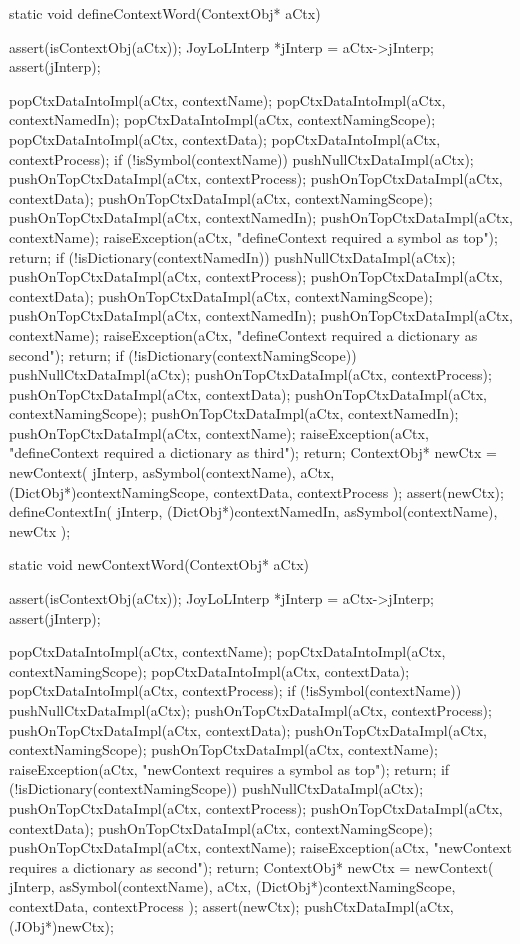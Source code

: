 \starttyping
\startCCode
static void defineContextWord(ContextObj* aCtx) {
  assert(isContextObj(aCtx));
  JoyLoLInterp *jInterp = aCtx->jInterp;
  assert(jInterp);
  
  popCtxDataIntoImpl(aCtx, contextName);
  popCtxDataIntoImpl(aCtx, contextNamedIn);
  popCtxDataIntoImpl(aCtx, contextNamingScope);
  popCtxDataIntoImpl(aCtx, contextData);
  popCtxDataIntoImpl(aCtx, contextProcess);
  if (!isSymbol(contextName)) {
    pushNullCtxDataImpl(aCtx);
    pushOnTopCtxDataImpl(aCtx, contextProcess);
    pushOnTopCtxDataImpl(aCtx, contextData);
    pushOnTopCtxDataImpl(aCtx, contextNamingScope);
    pushOnTopCtxDataImpl(aCtx, contextNamedIn);
    pushOnTopCtxDataImpl(aCtx, contextName);
    raiseException(aCtx,
      "defineContext required a symbol as top");
    return;
  }
  if (!isDictionary(contextNamedIn)) {
    pushNullCtxDataImpl(aCtx);
    pushOnTopCtxDataImpl(aCtx, contextProcess);
    pushOnTopCtxDataImpl(aCtx, contextData);
    pushOnTopCtxDataImpl(aCtx, contextNamingScope);
    pushOnTopCtxDataImpl(aCtx, contextNamedIn);
    pushOnTopCtxDataImpl(aCtx, contextName);
    raiseException(aCtx,
      "defineContext required a dictionary as second");
    return;
  }
  if (!isDictionary(contextNamingScope)) {
    pushNullCtxDataImpl(aCtx);
    pushOnTopCtxDataImpl(aCtx, contextProcess);
    pushOnTopCtxDataImpl(aCtx, contextData);
    pushOnTopCtxDataImpl(aCtx, contextNamingScope);
    pushOnTopCtxDataImpl(aCtx, contextNamedIn);
    pushOnTopCtxDataImpl(aCtx, contextName);
    raiseException(aCtx,
      "defineContext required a dictionary as third");
    return;
  }
  ContextObj* newCtx = newContext(
    jInterp,
    asSymbol(contextName),
    aCtx,
    (DictObj*)contextNamingScope,
    contextData,
    contextProcess
  );
  assert(newCtx);
  defineContextIn(
    jInterp,
    (DictObj*)contextNamedIn,
    asSymbol(contextName),
    newCtx
  );
}
\stopCCode

\startCCode
static void newContextWord(ContextObj* aCtx) {
  assert(isContextObj(aCtx));
  JoyLoLInterp *jInterp = aCtx->jInterp;
  assert(jInterp);

  popCtxDataIntoImpl(aCtx, contextName);
  popCtxDataIntoImpl(aCtx, contextNamingScope);
  popCtxDataIntoImpl(aCtx, contextData);
  popCtxDataIntoImpl(aCtx, contextProcess);
  if (!isSymbol(contextName)) {
    pushNullCtxDataImpl(aCtx);
    pushOnTopCtxDataImpl(aCtx, contextProcess);
    pushOnTopCtxDataImpl(aCtx, contextData);
    pushOnTopCtxDataImpl(aCtx, contextNamingScope);
    pushOnTopCtxDataImpl(aCtx, contextName);
    raiseException(aCtx,
      "newContext requires a symbol as top");
    return;
  }
  if (!isDictionary(contextNamingScope)) {
    pushNullCtxDataImpl(aCtx);
    pushOnTopCtxDataImpl(aCtx, contextProcess);
    pushOnTopCtxDataImpl(aCtx, contextData);
    pushOnTopCtxDataImpl(aCtx, contextNamingScope);
    pushOnTopCtxDataImpl(aCtx, contextName);
    raiseException(aCtx,
      "newContext requires a dictionary as second");
    return;
  }
  ContextObj* newCtx = newContext(
    jInterp,
    asSymbol(contextName),
    aCtx,
    (DictObj*)contextNamingScope,
    contextData,
    contextProcess
  );
  assert(newCtx);
  pushCtxDataImpl(aCtx, (JObj*)newCtx);
}
\stopCCode

